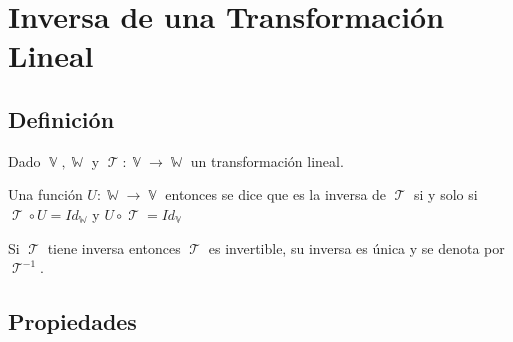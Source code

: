 \documentclass[12pt, fleqn]{report}                             %
\theoremstyle{break}                                            %
\DeclareMathOperator \VectorSet    {\mathbb{V}}                 %
\DeclareMathOperator \SubVectorSet {\mathbb{W}}                 %
\DeclareMathOperator \LinTrans      {\mathcal{T}}               %
\begin{document}
        \clearpage
        \section{Inversa de una Transformación Lineal}

            \subsection{Definición}

                Dado $\VectorSet, \SubVectorSet$ y $\LinTrans: \VectorSet \to \SubVectorSet$ un
                transformación lineal.

                Una función $U: \SubVectorSet \to \VectorSet$ entonces
                se dice que es la inversa de $\LinTrans$ si y solo si
                $\LinTrans \circ U = Id_{\SubVectorSet}$ y $U \circ \LinTrans = Id_{\VectorSet}$

                Si $\LinTrans$ tiene inversa entonces $\LinTrans$ es invertible, su inversa
                es única y se denota por $\LinTrans^{-1}$.


            
            \vspace{1em}
            \subsection{Propiedades} 
\end{document}
